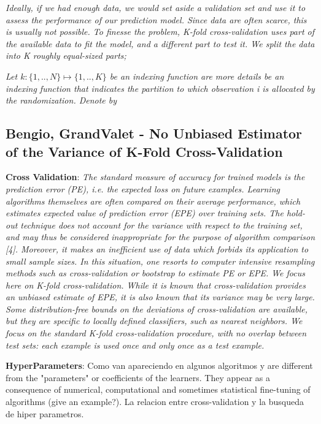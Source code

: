 \textit{Ideally, if we had enough data, we would set aside a validation set and use it to assess the performance of our prediction model. Since data are often scarce, this is usually not possible. To finesse the problem, K-fold cross-validation uses part of the available data to fit the model, and a different part to test it. We split the data into K roughly equal-sized parts; }

\textit{Let $k : \{1,..,N\} \mapsto \{1, .., K\}$ be an indexing function are more details be an indexing
function that indicates the partition to which observation i is allocated by the randomization. Denote by}


\subsection{Bengio, GrandValet - No Unbiased Estimator of the Variance of K-Fold Cross-Validation}
\textbf{Cross Validation}: 
\textit{The standard measure of accuracy for trained models is the prediction error (PE), i.e. the expected loss on future examples. Learning algorithms themselves are often compared on their average performance, which estimates expected value of prediction error (EPE) over training sets.
The hold-out technique does not account for the variance with respect to the training set, and may thus be considered inappropriate for the purpose of algorithm comparison [4]. Moreover, it makes an inefficient use of data which forbids its application to small sample sizes. In this situation, one resorts to computer intensive resampling methods such as cross-validation or bootstrap to estimate PE or EPE. We focus here on K-fold cross-validation. While it is known that cross-validation provides an unbiased estimate of EPE, it is also known that its variance may be very large.
Some distribution-free bounds on the deviations of cross-validation are available, but they are specific to locally defined classifiers, such as nearest neighbors.
We focus on the standard K-fold cross-validation procedure, with no overlap between test sets: each example is used once and only once as a test example.
}


\textbf{HyperParameters}:
Como van apareciendo en algunos algoritmos y are different from the "parameters" or coefficients of the learners. They appear as a consequence of numerical, computational and sometimes statistical fine-tuning of algorithms (give an example?). 
La relacion entre cross-validation y la busqueda de hiper parametros. 

\textit{}

\textit{}


